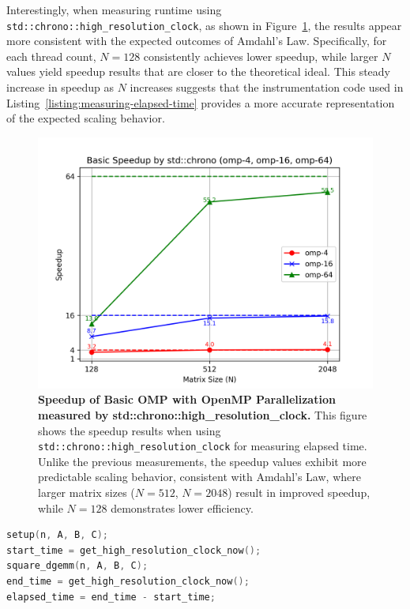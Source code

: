 Interestingly, when measuring runtime using \texttt{std::chrono::high\_resolution\_clock}, as shown in Figure~\ref{fig:basic-speedup-chrono}, the results appear more consistent with the expected outcomes of Amdahl's Law. Specifically, for each thread count, \(N = 128\) consistently achieves lower speedup, while larger \(N\) values yield speedup results that are closer to the theoretical ideal. This steady increase in speedup as \(N\) increases suggests that the instrumentation code used in Listing~\ref{listing:measuring-elapsed-time} provides a more accurate representation of the expected scaling behavior.

\begin{figure}[htbp]
    \centering
    \includegraphics[width=1.0\linewidth]{images/Basic_Speedup_chrono.png}
    \caption{\textbf{Speedup of Basic OMP with OpenMP Parallelization measured by std::chrono::high\_resolution\_clock.} This figure shows the speedup results when using \texttt{std::chrono::high\_resolution\_clock} for measuring elapsed time. Unlike the previous measurements, the speedup values exhibit more predictable scaling behavior, consistent with Amdahl's Law, where larger matrix sizes (\(N = 512\), \(N = 2048\)) result in improved speedup, while \(N = 128\) demonstrates lower efficiency.}
    \label{fig:basic-speedup-chrono}
\end{figure}

\begin{lstlisting}[caption={Instrumentation code for measuring the elapsed time of MM},label={listing:measuring-elapsed-time},name=measuring-elapsed-time,float=htbp,style=mystyle,language=C++]
setup(n, A, B, C);
start_time = get_high_resolution_clock_now();
square_dgemm(n, A, B, C);
end_time = get_high_resolution_clock_now();
elapsed_time = end_time - start_time;
\end{lstlisting}
